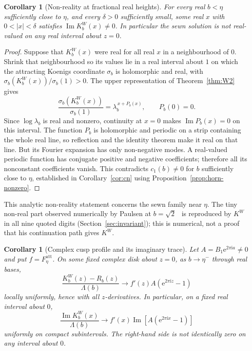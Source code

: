 \documentclass[11pt]{amsart}
\newtheorem{corollary}[theorem]{Corollary}
\theoremstyle{definition}
\newcommand{\Rr}{R}
\newcommand{\Kk}{K}
\newcommand{\eee}{\mathrm{e}}
\newcommand{\ii}{\mathrm{i}}
\begin{document}
\begin{corollary}[Non-reality at fractional real heights]
\label{cor:sewn-nonreal}
For every real $b<\eta$ sufficiently close to $\eta$, and every
$\delta>0$ sufficiently small, some real $x$ with $0<|x|<\delta$
satisfies $\operatorname{Im}\Kk_b^W(x)\ne0$.  In particular the sewn
solution is not real-valued on any real interval about $z=0$.
\end{corollary}

\begin{proof}
Suppose that $\Kk_b^W(x)$ were real for all real $x$ in a neighbourhood
of $0$.  Shrink that neighbourhood so its values lie in a real interval
about $1$ on which the attracting Koenigs coordinate $\sigma_b$ is
holomorphic and real, with $\sigma_b(\Kk_b^W(x))/\sigma_b(1)>0$.
The upper representation of Theorem~\ref{thm:W2} gives
\[
 \frac{\sigma_b(\Kk_b^W(x))}{\sigma_b(1)}
   =\lambda_b^{\,x+P_b(x)},\qquad P_b(0)=0.
\]
Since $\log\lambda_b$ is real and nonzero, continuity at $x=0$ makes
$\operatorname{Im}P_b(x)=0$ on this interval.  The function $P_b$ is
holomorphic and periodic on a strip containing the whole real line,
so reflection and the identity theorem make it real on that line.
But its Fourier expansion has only non-negative modes.  A real-valued
periodic function has conjugate positive and negative coefficients;
therefore all its nonconstant coefficients vanish.  This contradicts
$c_1(b)\ne0$ for $b$ sufficiently close to $\eta$, established in
Corollary~\ref{cor:cn} using Proposition~\ref{prop:horn-nonzero}.
\end{proof}

This analytic non-reality statement concerns the sewn family near $\eta$.
The tiny non-real part observed numerically by Paulsen at
$b=\sqrt2$~\cite[\S6]{Paulsen2019} is reproduced by $\Kk^W$ in all nine quoted
digits (Section~\ref{sec:invariant}); this is numerical, not a proof that his
continuation path gives $\Kk^W$.

\begin{corollary}[Complex cusp profile and its imaginary trace]
\label{cor:imaginary-profile}
Let $A=B_1\eee^{2\pi\ii a}\ne0$ and put $f=F_\eta^{\mathrm{att}}$.
On some fixed complex disk about $z=0$, as $b\to\eta^-$ through real bases,
\[
 \frac{\Kk_b^W(z)-\Rr_b(z)}{\Lambda(b)}
 \longrightarrow f'(z)A(\eee^{2\pi\ii z}-1)
\]
locally uniformly, hence with all $z$-derivatives.  In particular, on
a fixed real interval about $0$,
\[
 \frac{\operatorname{Im}\Kk_b^W(x)}{\Lambda(b)}
 \longrightarrow
 f'(x)
   \operatorname{Im}\!\left[A(\eee^{2\pi\ii x}-1)\right]
\]
uniformly on compact subintervals.  The right-hand side is not
identically zero on any interval about $0$.
\end{corollary}
\end{document}
